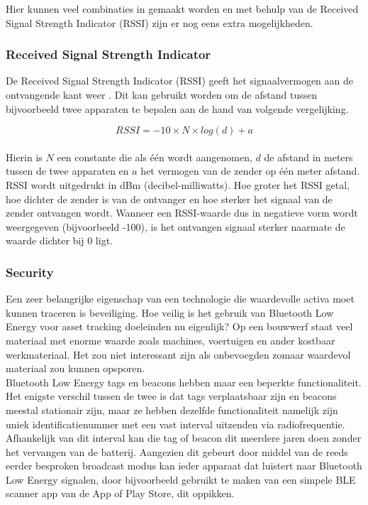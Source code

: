 Hier kunnen veel combinaties in gemaakt worden en met behulp van de Received Signal Strength Indicator (RSSI) zijn er nog eens extra mogelijkheden.

\subsubsection{Received Signal Strength Indicator}

De Received Signal Strength Indicator (RSSI) geeft het signaalvermogen aan de ontvangende kant weer \autocite{Jais2015} . Dit kan gebruikt worden om de afstand tussen bijvoorbeeld twee apparaten te bepalen aan de hand van volgende vergelijking.

\begin{equation}
    \label{rssi}
    RSSI=−10×N×log(d)+a
\end{equation}\\

Hierin is $N$ een constante die als één wordt aangenomen, $d$ de afstand in meters tussen de twee apparaten en $a$ het vermogen van de zender op één meter afstand.\\

RSSI wordt uitgedrukt in dBm (decibel-milliwatts). Hoe groter het RSSI getal, hoe dichter de zender is van de ontvanger en hoe sterker het signaal van de zender ontvangen wordt. Wanneer een RSSI-waarde dus in negatieve vorm wordt weergegeven (bijvoorbeeld -100), is het ontvangen signaal sterker naarmate de waarde dichter bij 0 ligt.

\subsubsection{Security}
Een zeer belangrijke eigenschap van een technologie die waardevolle activa moet kunnen traceren is beveiliging. Hoe veilig is het gebruik van Bluetooth Low Energy voor asset tracking doeleinden nu eigenlijk? Op een bouwwerf staat veel materiaal met enorme waarde zoals machines, voertuigen en ander kostbaar werkmateriaal. Het zou niet interessant zijn als onbevoegden zomaar waardevol materiaal zou kunnen opsporen.\\

Bluetooth Low Energy tags en beacons hebben maar een beperkte functionaliteit. Het enigste verschil tussen de twee is dat tags verplaatsbaar zijn en beacons meestal stationair zijn, maar ze hebben dezelfde functionaliteit namelijk zijn uniek identificatienummer met een vast interval uitzenden via radiofrequentie. Afhankelijk van dit interval kan die tag of beacon dit meerdere jaren doen zonder het vervangen van de batterij. Aangezien dit gebeurt door middel van de reeds eerder besproken broadcast modus \autocite{Sevier2019} kan ieder apparaat dat luistert naar Bluetooth Low Energy signalen, door bijvoorbeeld gebruikt te maken van een simpele BLE scanner app van de App of Play Store, dit oppikken. \\

